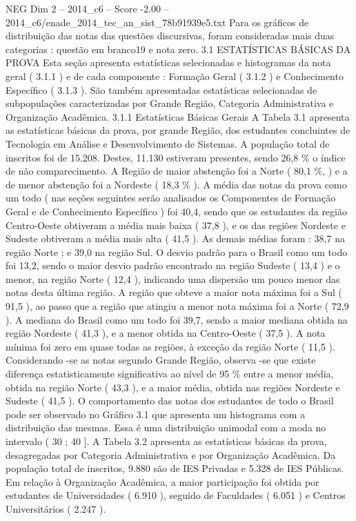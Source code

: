 \begin{textsample}{NEG Dim 2 – 2014\_c6 – Score -2.00 – 2014\_c6/enade\_2014\_tec\_an\_sist\_78b91939e5.txt}
Para os gráficos de distribuição das notas das questões discursivas, foram consideradas mais duas categorias : questão em branco19 e nota zero. 3.1 ESTATÍSTICAS BÁSICAS DA PROVA Esta seção apresenta estatísticas selecionadas e histogramas da nota geral ( 3.1.1 ) e de cada componente : Formação Geral ( 3.1.2 ) e Conhecimento Específico ( 3.1.3 ).
São também apresentadas estatísticas selecionadas de subpopulações caracterizadas por Grande Região, Categoria Administrativa e Organização Acadêmica. 3.1.1 Estatísticas Básicas Gerais A Tabela 3.1 apresenta as estatísticas básicas da prova, por grande Região, dos estudantes concluintes de Tecnologia em Análise e Desenvolvimento de Sistemas.
A população total de inscritos foi de 15.208.
Destes, 11.130 estiveram presentes, sendo 26,8 \% o índice de não comparecimento.
A Região de maior abstenção foi a Norte ( 80,1 \%, ) e a de menor abstenção foi a Nordeste ( 18,3 \% ).
A média das notas da prova como um todo ( nas seções seguintes serão analisados os Componentes de Formação Geral e de Conhecimento Específico ) foi 40,4, sendo que os estudantes da região Centro-Oeste obtiveram a média mais baixa ( 37,8 ), e os das regiões Nordeste e Sudeste obtiveram a média mais alta ( 41,5 ).
As demais médias foram : 38,7 na região Norte ; e 39,0 na região Sul.
O desvio padrão para o Brasil como um todo foi 13,2, sendo o maior desvio padrão encontrado na região Sudeste ( 13,4 ) e o menor, na região Norte ( 12,4 ), indicando uma dispersão um pouco menor das notas desta última região.
A região que obteve a maior nota máxima foi a Sul ( 91,5 ), ao passo que a região que atingiu a menor nota máxima foi a Norte ( 72,9 ).
A mediana do Brasil como um todo foi 39,7, sendo a maior mediana obtida na região Nordeste ( 41,3 ), e a menor obtida na Centro-Oeste ( 37,5 ).
A nota mínima foi zero em quase todas as regiões, à exceção da região Norte ( 11,5 ).
Considerando -se as notas segundo Grande Região, observa -se que existe diferença estatisticamente significativa ao nível de 95 \% entre a menor média, obtida na região Norte ( 43,3 ), e a maior média, obtida nas regiões Nordeste e Sudeste ( 41,5 ).
O comportamento das notas dos estudantes de todo o Brasil pode ser observado no Gráfico 3.1 que apresenta um histograma com a distribuição das mesmas.
Essa é uma distribuição unimodal com a moda no intervalo ( 30 ; 40 ].
A Tabela 3.2 apresenta as estatísticas básicas da prova, desagregadas por Categoria Administrativa e por Organização Acadêmica.
Da população total de inscritos, 9.880 são de IES Privadas e 5.328 de IES Públicas.
Em relação à Organização Acadêmica, a maior participação foi obtida por estudantes de Universidades ( 6.910 ), seguido de Faculdades ( 6.051 ) e Centros Universitários ( 2.247 ).

\end{textsample}
